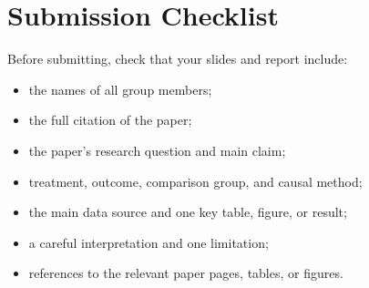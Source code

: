 \documentclass[12pt]{article}
\begin{document}



\section*{Submission Checklist}

Before submitting, check that your slides and report include:

\begin{itemize}
    \item the names of all group members;
    \item the full citation of the paper;
    \item the paper's research question and main claim;
    \item treatment, outcome, comparison group, and causal method;
    \item the main data source and one key table, figure, or result;
    \item a careful interpretation and one limitation;
    \item references to the relevant paper pages, tables, or figures.
\end{itemize}
\end{document}
